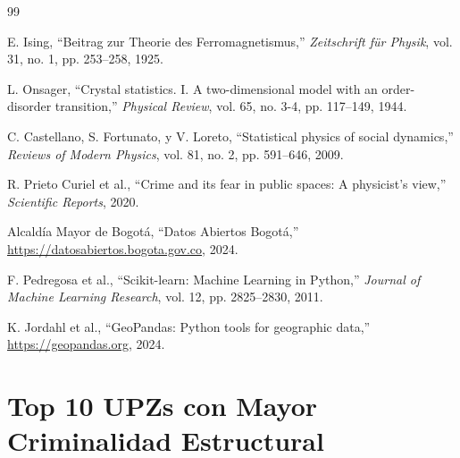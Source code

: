 \documentclass[12pt,a4paper]{article}
\begin{document}
\begin{thebibliography}{99}

E. Ising, ``Beitrag zur Theorie des Ferromagnetismus,'' \textit{Zeitschrift für Physik}, vol. 31, no. 1, pp. 253--258, 1925.

L. Onsager, ``Crystal statistics. I. A two-dimensional model with an order-disorder transition,'' \textit{Physical Review}, vol. 65, no. 3-4, pp. 117--149, 1944.

C. Castellano, S. Fortunato, y V. Loreto, ``Statistical physics of social dynamics,'' \textit{Reviews of Modern Physics}, vol. 81, no. 2, pp. 591--646, 2009.

R. Prieto Curiel et al., ``Crime and its fear in public spaces: A physicist's view,'' \textit{Scientific Reports}, 2020.

Alcaldía Mayor de Bogotá, ``Datos Abiertos Bogotá,'' \url{https://datosabiertos.bogota.gov.co}, 2024.

F. Pedregosa et al., ``Scikit-learn: Machine Learning in Python,'' \textit{Journal of Machine Learning Research}, vol. 12, pp. 2825--2830, 2011.

K. Jordahl et al., ``GeoPandas: Python tools for geographic data,'' \url{https://geopandas.org}, 2024.

\end{thebibliography}

\appendix
\section{Top 10 UPZs con Mayor Criminalidad Estructural}
\end{document}
